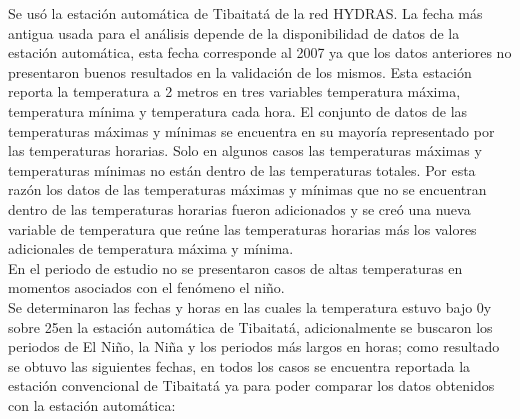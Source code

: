 Se usó la estación automática de Tibaitatá de la red HYDRAS. La fecha más antigua usada para el análisis depende de la disponibilidad de datos de la estación automática, esta fecha corresponde al 2007 ya que los datos anteriores no presentaron buenos resultados en la validación de los mismos. Esta estación reporta la temperatura a 2 metros en tres variables temperatura máxima, temperatura mínima y temperatura cada hora. El conjunto de datos de las temperaturas máximas y mínimas se encuentra en su mayoría representado por las temperaturas horarias. Solo en algunos casos las temperaturas máximas y temperaturas mínimas no están dentro de las temperaturas totales. Por esta razón los datos de las temperaturas máximas y mínimas que no se encuentran dentro de las temperaturas horarias fueron adicionados y se creó una nueva variable de temperatura que reúne las temperaturas horarias más los valores adicionales de temperatura máxima y mínima.\\

En el periodo de estudio no se presentaron casos de altas temperaturas en momentos asociados con el fenómeno el niño.\\

Se determinaron las fechas y horas en las cuales la temperatura estuvo bajo 0\celc y sobre 25\celc en la estación automática de Tibaitatá, adicionalmente se buscaron los periodos de El Niño, la Niña y los periodos más largos en horas; como resultado se obtuvo las siguientes fechas, en todos los casos se encuentra reportada la estación convencional de Tibaitatá ya para poder comparar los datos obtenidos con la estación automática:


